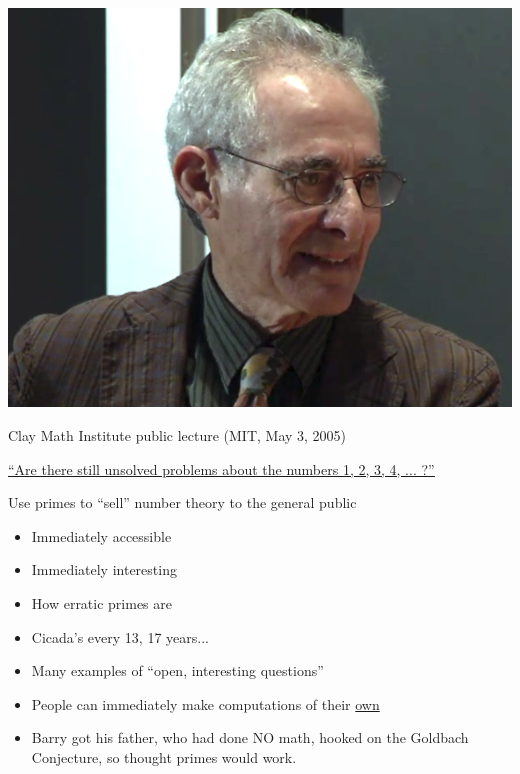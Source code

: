 \documentclass{beamer}
\begin{document}
\begin{frame}
\begin{center}
\includegraphics[height=.7\textheight]{pics/barry-msri}
\end{center}

\end{frame}


\begin{frame}{Clay Math Institute public lecture (MIT, May 3, 2005)}
  \begin{center}
    \href{http://www.claymath.org/library/public\_lectures/mazur\_riemann\_hypothesis.pdf}{\small\underline{``Are there still unsolved problems about the numbers 1, 2, 3, 4, ... ?''}}
  \end{center}

  \vfill

  \begin{block}{Use primes to ``sell'' number theory to the general public}
    \begin{itemize}
      \item   Immediately accessible
      \item   Immediately interesting
      \item   How erratic primes are
      \item   Cicada's every 13, 17 years...
      \item   Many examples of ``open, interesting questions''
      \item   People can immediately make computations of their \underline{own}
      \item   Barry got his father, who had done NO
            math, hooked on the Goldbach Conjecture, so thought
            primes would work.
    \end{itemize}
  \end{block}
\end{frame}
\end{document}
